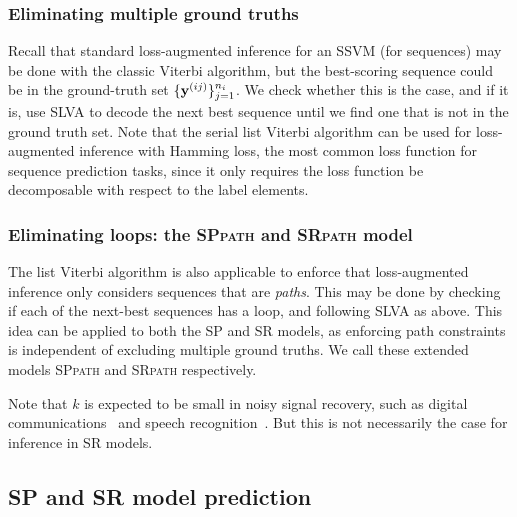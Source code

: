 \subsubsection{Eliminating multiple ground truths}
Recall that standard loss-augmented inference for an SSVM (for sequences) may be done with the classic Viterbi algorithm, but the best-scoring sequence could be in the ground-truth set $\{\mathbf{y}^{(ij)}\}_{j=1}^{n_i}$. We check whether this is the case, and if it is, use SLVA to decode the next best sequence until we find one that is not in the ground truth set.
Note that the serial list Viterbi algorithm
can be used for loss-augmented inference with Hamming loss, the most common loss function for sequence prediction tasks,
since it only requires the loss function be decomposable with respect to the label elements.

%
\subsubsection{Eliminating loops: the \textsc{SPpath} and \textsc{SRpath} model}
The list Viterbi algorithm is also applicable to enforce that loss-augmented inference only considers sequences that are \emph{paths}. This may be done by checking if each of the next-best sequences has a loop, and following SLVA as above.
This idea can be applied to both the SP and SR models, as enforcing path constraints is independent of excluding multiple ground truths.
We call these extended models \textsc{SPpath} and \textsc{SRpath} respectively.

Note that $k$ is expected to be small in noisy signal recovery, such as digital communications~\cite{nill1995list} and speech recognition~\cite{soong1991tree}. But this is not necessarily the case for inference in SR models.

\subsection{SP and SR model prediction}
\label{ssec:testing}

